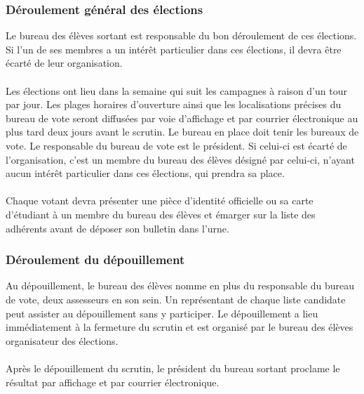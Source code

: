 \documentclass{article} %
\begin{document}
			\subsubsection{Déroulement général des élections}
\label{ssub:deroulement_general_des_elections}

				Le bureau des élèves sortant est responsable du bon déroulement
				de ces élections. Si l'un de ses membres a un intérêt
				particulier dans ces élections, il devra être écarté de leur
				organisation.

                \paragraph{}
				Les élections ont lieu dans la semaine qui suit les campagnes à
				raison d’un tour par jour. Les plages horaires d’ouverture ainsi
				que les localisations précises du bureau de vote seront
				diffusées par voie d’affichage et par courrier électronique au
				plus tard deux jours avant le scrutin. Le bureau en place doit
				tenir les bureaux de vote. Le responsable du bureau de vote est
				le président. Si celui-ci est écarté de l’organisation, c'est un
				membre du bureau des élèves désigné par celui-ci, n'ayant aucun
				intérêt particulier dans ces élections, qui prendra sa place.

                \paragraph{}
				Chaque votant devra présenter une pièce d’identité officielle ou
				sa carte d’étudiant à un membre du bureau des élèves et émarger
				sur la liste des adhérents avant de déposer son bulletin dans
				l’urne.

			\subsubsection{Déroulement du dépouillement}
\label{ssub:deroulement_du_depouillement}

				Au dépouillement, le bureau des élèves nomme en plus du
				responsable du bureau de vote, deux assesseurs en son sein. Un
				représentant de chaque liste candidate peut assister au
				dépouillement sans y participer. Le dépouillement a lieu
				immédiatement à la fermeture du scrutin et est organisé par le
				bureau des élèves organisateur des élections.

                \paragraph{}
				Après le dépouillement du scrutin, le président du bureau
				sortant proclame le résultat par affichage et par courrier
				électronique.
\end{document}
